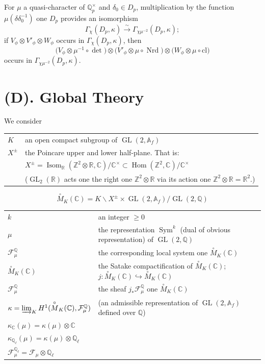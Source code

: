 \documentclass[11pt,a4paper]{article}
\theoremstyle{plain}
\theoremstyle{definition}
\theoremstyle{remark}
\DeclareMathOperator{\Hom}{Hom}
\DeclareMathOperator{\Isom}{Isom}
\DeclareMathOperator{\GL}{GL}
\DeclareMathOperator{\Sym}{Sym}
\DeclareMathOperator{\Nrd}{Nrd}
\newcommand{\C}{\mathbb{C}}
\newcommand{\Q}{\mathbb{Q}}
\newcommand{\R}{\mathbb{R}}
\newcommand{\Z}{\mathbb{Z}}
\newcommand{\Af}{\mathbb{A}_{f}}
\newcommand{\Qp}{\mathbb{Q}_{p}}
\newcommand{\Ql}{\mathbb{Q}_{\ell}}
\begin{document}
For $\mu$ a quasi-character of $\Qp^{\times}$ and $\delta_{0} \in D_{p}$, multiplication by the function $\mu(\delta\delta_{0}^{-1})$ one $D_{p}$ provides an isomorphism
\[
\Gamma_{\chi}(D_{p}, \kappa) \xrightarrow{\sim} \Gamma_{\chi\mu^{-2}}(D_{p}, \kappa);
\]
if $V_{\phi} \otimes V'_{\phi} \otimes W_{\phi}$ occurs in $\Gamma_{\chi}(D_{p}, \kappa)$, then
\[
\bigl(V_{\phi} \otimes \mu^{-1} \circ \det\bigr) \otimes \bigl(V'_{\phi} \otimes \mu \circ \Nrd\bigr) \otimes \bigl(W_{\phi} \otimes \mu \circ \mathrm{cl}\bigr)
\]
occurs in $\Gamma_{\chi\mu^{-2}}(D_{p}, \kappa)$.


\section*{(D). Global Theory}

We consider
\begin{center}
\begin{tabular}{@{}ll@{}}
$K$ & an open compact subgroup of $\GL(2, \Af)$ \\
$X^{\pm}$ & the Poincare upper and lower half-plane. That is: \\
& $X^{\pm} = \Isom_{\R}(\Z^{2} \otimes \R, \C)/\C^{\times} \subset \Hom(\Z^{2}, \C)/\C^{\times}$ \\
& ($\GL_{2}(\R)$ acts one the right one $\Z^{2} \otimes \R$ via its action one $\Z^{2} \otimes \R = \R^{2}$.)
\end{tabular}
\end{center}
\[
\overset{\circ}{M}_{K}(\C) = K \backslash X^{\pm} \times \GL(2, \Af)/\GL(2, \Q)
\]
\begin{center}
\begin{tabular}{@{}ll@{}}
$k$ & an integer $\geq 0$ \\
$\mu$ & the representation $\Sym^{k}$ (dual of obvious representation) of $\GL(2, \Q)$ \\
$\mathcal{F}_{\mu}^{\Q}$ & the corresponding local system one $\overset{\circ}{M}_{K}(\C)$ \\
$\overset{\circ}{M}_{K}(\C)$ & the Satake compactification of $\overset{\circ}{M}_{K}(\C)$; $j : \overset{\circ}{M}_{K}(\C) \hookrightarrow \overset{\circ}{M}_{K}(\C)$ \\
$\mathcal{F}_{\mu}^{\Q}$ & the sheaf $j_{*} \mathcal{F}_{\mu}^{\Q}$ one $\overset{\circ}{M}_{K}(\C)$ \\
$\kappa = \varinjlim_{K} H^{1}(\overset{\circ}{M}_{K}(\C), \mathcal{F}_{\mu}^{\Q})$ & (an admissible representation of $\GL(2, \Af)$ defined over $\Q$) \\
$\kappa_{\C}(\mu) = \kappa(\mu) \otimes \C$ & \\
$\kappa_{\Ql}(\mu) = \kappa(\mu) \otimes \Ql$ & \\
$\mathcal{F}_{\mu}^{\Ql} = \mathcal{F}_{\mu} \otimes \Ql$ &
\end{tabular}
\end{center}
\end{document}
